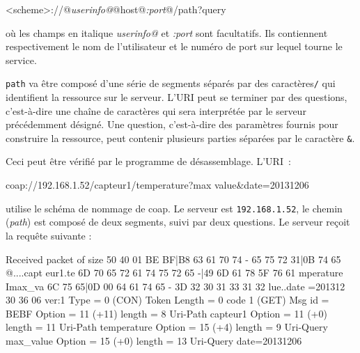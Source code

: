 \begin{termc}[backgroundcolor=\color{blue!10}, basicstyle=\ttfamily\small, escapechar=@]
<scheme>://@\textit{userinfo@}@host@\textit{:port}@/path?query
\end{termc}

\noindent où les champs en italique \textit{userinfo@} et \textit{:port} sont facultatifs. Ils contiennent respectivement le nom de l’utilisateur et le numéro de port sur lequel tourne le service.

         \vspace{1em}

\texttt{path} va être composé d’une série de segments séparés par des caractères\texttt{/} qui identifient la ressource sur le serveur. L’URI peut se terminer par des questions, c’est-à-dire une chaîne de caractères qui sera interprétée par le serveur précédemment désigné. Une question, c'est-à-dire des paramètres fournis pour construire la ressource, peut contenir plusieurs parties séparées par le caractère \texttt{&}.

         \vspace{1em}

Ceci peut être vérifié par le programme de désassemblage. L’URI~:

\begin{termc}[backgroundcolor=\color{blue!10}, basicstyle=\ttfamily\small, escapechar=@]
coap://192.168.1.52/capteur1/temperature?max value&date=20131206
\end{termc}

\noindent utilise le schéma de nommage de coap. Le serveur est \texttt{192.168.1.52}, le chemin (\textit{path}) est composé de deux segments, suivi par deux questions. Le serveur reçoit la requête suivante : 

\begin{termc}[backgroundcolor=\color{blue!10}, basicstyle=\ttfamily\small, , escapechar=#]
Received packet of size 50
40 01 BE BF|B8 63 61 70 74  - 65 75 72 31|0B 74 65 @....capt eur1.te
6D 70 65 72 61 74 75 72 65  -|49 6D 61 78 5F 76 61 mperature Imax_va
6C 75 65|0D 00 64 61 74 65  - 3D 32 30 31 33 31 32 lue..date =201312
30 36                                              06
ver:1 Type = 0 (CON) Token Length = 0 code 1 (GET) Msg id = BEBF
Option = 11 (+11) length = 8
Uri-Path capteur1
Option = 11 (+0) length = 11
Uri-Path temperature
Option = 15 (+4) length = 9
Uri-Query max_value
Option = 15 (+0) length = 13
Uri-Query date=20131206
\end{termc}


